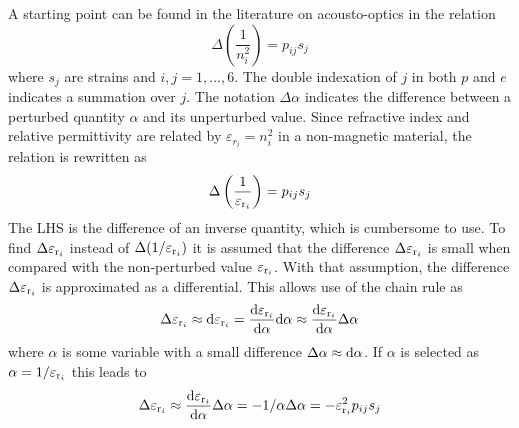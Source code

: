 \documentclass[11pt,twoside]{eitExjobb}
\begin{document}
	A starting point can be found in the literature on acousto-optics in the relation \cite{Korpel1988}
	\begin{equation*}
		\Delta \left( \frac{1}{n_i^2} \right) = p_{ij} s_j
	\end{equation*}
	where $s_j$ are strains and $i,j = 1,\dotsc,6$. The double indexation of $j$ in both $p$ and $e$ indicates a summation over $j$. The notation $\Delta \alpha$ indicates the difference between a perturbed quantity $\alpha$ and its unperturbed value. Since refractive index and relative permittivity are related by $\varepsilon_{r_i} = n_i^2$ in a non-magnetic material, the relation is rewritten as
	\begin{equation*}
	\Delta \left( \frac{1}{\varepsilon_{\mathrm{r}_i}} \right) = p_{ij} s_j
	\end{equation*}
	The LHS is the difference of an inverse quantity, which is cumbersome to use. To find $\Delta \varepsilon_{\mathrm{r}_i}$ instead of $\Delta(1/\varepsilon_{\mathrm{r}_i})$ it is assumed that the difference $\Delta \varepsilon_{\mathrm{r}_i}$ is small when compared with the non-perturbed value $\varepsilon_{\mathrm{r}_i}$. With that assumption, the difference $\Delta \varepsilon_{\mathrm{r}_i}$ is approximated as a differential. This allows use of the chain rule as
	\begin{equation*}
		\Delta \varepsilon_{\mathrm{r}_i} \approx \mathrm{d} \varepsilon_{\mathrm{r}_i} = \frac{\mathrm{d} \varepsilon_{\mathrm{r}_i}}{\mathrm{d} \alpha} \mathrm{d} \alpha \approx \frac{\mathrm{d} \varepsilon_{\mathrm{r}_i}}{\mathrm{d} \alpha} \Delta \alpha
	\end{equation*}
	where $\alpha$ is some variable with a small difference $\Delta \alpha \approx \mathrm{d} \alpha$. If $\alpha$ is selected as $\alpha = 1/\varepsilon_{\mathrm{r}_i}$ this leads to
	\begin{equation*}
		\Delta \varepsilon_{\mathrm{r}_i} \approx \frac{\mathrm{d}\varepsilon_{\mathrm{r}_i}}{\mathrm{d}\alpha} \Delta \alpha = - 1/\alpha \Delta \alpha = - \varepsilon_{\mathrm{r}_i}^2 p_{ij} s_j
	\end{equation*}
	
\end{document}
